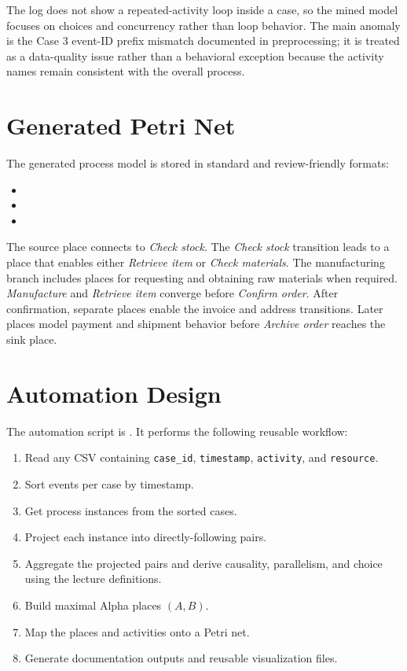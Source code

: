 \documentclass[11pt,a4paper]{article}
\begin{document}
The log does not show a repeated-activity loop inside a case, so the mined model focuses on choices and concurrency rather than loop behavior. The main anomaly is the Case 3 event-ID prefix mismatch documented in preprocessing; it is treated as a data-quality issue rather than a behavioral exception because the activity names remain consistent with the overall process.

\section{Generated Petri Net}
The generated process model is stored in standard and review-friendly formats:
\begin{itemize}
  \item {}
  \item {}
  \item {}
\end{itemize}

The source place connects to \textit{Check stock}. The \textit{Check stock} transition leads to a place that enables either \textit{Retrieve item} or \textit{Check materials}. The manufacturing branch includes places for requesting and obtaining raw materials when required. \textit{Manufacture} and \textit{Retrieve item} converge before \textit{Confirm order}. After confirmation, separate places enable the invoice and address transitions. Later places model payment and shipment behavior before \textit{Archive order} reaches the sink place.


\section{Automation Design}
The automation script is . It performs the following reusable workflow:
\begin{enumerate}
  \item Read any CSV containing \texttt{case\_id}, \texttt{timestamp}, \texttt{activity}, and \texttt{resource}.
  \item Sort events per case by timestamp.
  \item Get process instances from the sorted cases.
  \item Project each instance into directly-following pairs.
  \item Aggregate the projected pairs and derive causality, parallelism, and choice using the lecture definitions.
  \item Build maximal Alpha places $(A,B)$.
  \item Map the places and activities onto a Petri net.
  \item Generate documentation outputs and reusable visualization files.
\end{enumerate}
\end{document}
